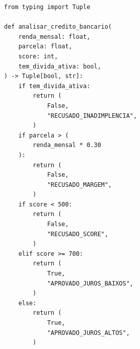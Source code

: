\ifmostrarGabarito
\begin{verbatim}
from typing import Tuple

def analisar_credito_bancario(
    renda_mensal: float,
    parcela: float,
    score: int,
    tem_divida_ativa: bool,
) -> Tuple[bool, str]:
    if tem_divida_ativa:
        return (
            False,
            "RECUSADO_INADIMPLENCIA",
        )
    if parcela > (
        renda_mensal * 0.30
    ):
        return (
            False,
            "RECUSADO_MARGEM",
        )
    if score < 500:
        return (
            False,
            "RECUSADO_SCORE",
        )
    elif score >= 700:
        return (
            True,
            "APROVADO_JUROS_BAIXOS",
        )
    else:
        return (
            True,
            "APROVADO_JUROS_ALTOS",
        )
\end{verbatim}

\fi
